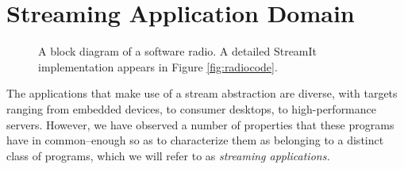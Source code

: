 \section{Streaming Application Domain}
\label{sec:domain}

\begin{figure*}[ht]
\centering
{}
\vspace{-6pt}
\caption{A block diagram of a software radio.  A detailed StreamIt
implementation appears in Figure \ref{fig:radiocode}.}
\vspace{-6pt}
\label{fig:radiodiagram}
\end{figure*}

The applications that make use of a stream abstraction are diverse,
with targets ranging from embedded devices, to consumer desktops, to
high-performance servers.  However, we have observed a number of
properties that these programs have in common--enough so as to
characterize them as belonging to a distinct class of programs, which
we will refer to as {\it streaming applications.}  

